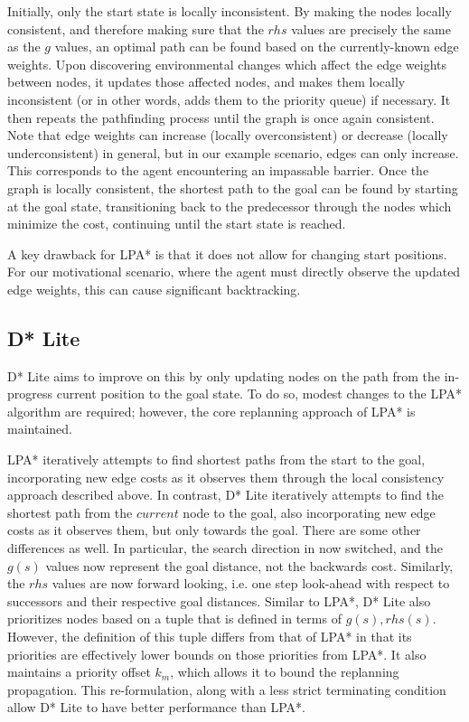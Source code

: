 	    Initially, only the start state is locally inconsistent. By making the nodes locally consistent, and therefore making sure that the $rhs$ values are precisely the same as the $g$ values, an optimal path can be found based on the currently-known edge weights. Upon discovering environmental changes which affect the edge weights between nodes, it updates those affected nodes, and makes them locally inconsistent (or in other words, adds them to the priority queue) if necessary. It then repeats the pathfinding process until the graph is once again consistent. Note that edge weights can increase (locally overconsistent) or decrease (locally underconsistent) in general, but in our example scenario, edges can only increase. This corresponds to the agent encountering an impassable barrier. Once the graph is locally consistent, the shortest path to the goal can be found by starting at the goal state, transitioning back to the predecessor through the nodes which minimize the cost, continuing until the start state is reached.  
	
		A key drawback for LPA* is that it does not allow for changing start positions. For our motivational scenario, where the agent must directly observe the updated edge weights, this can cause significant backtracking.
	
	\subsection{D* Lite}
		 D* Lite \cite{koenig2004lifelong} \cite{simmons1995probabilistic} aims to improve on this by only updating nodes on the path from the in-progress current position to the goal state. To do so, modest changes to the LPA* algorithm are required; however, the core replanning approach of LPA* is maintained.
		
		LPA* iteratively attempts to find shortest paths from the start to the goal, incorporating new edge costs as it observes them through the local consistency approach described above. In contrast, D* Lite iteratively attempts to find the shortest path from the $current$ node to the goal, also incorporating new edge costs as it observes them, but only towards the goal. There are some other differences as well. In particular, the search direction in now switched, and the $g(s)$ values now represent the goal distance, not the backwards cost. Similarly, the $rhs$ values are now forward looking, i.e. one step look-ahead with respect to successors and their respective goal distances. Similar to LPA*, D* Lite also prioritizes nodes based on a tuple that is defined in terms of  $g(s), rhs(s)$. However, the definition of this tuple differs from that of LPA* in that its priorities are effectively lower bounds on those priorities from LPA*. It also maintains a priority offset $k_m$, which allows it to bound the replanning propagation. This re-formulation, along with a less strict terminating condition allow D* Lite to have better performance than LPA*.
		
